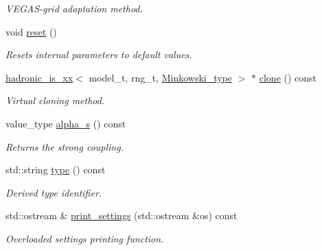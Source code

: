 \begin{DoxyCompactItemize}
\begin{DoxyCompactList}\small\item\em V\+E\+G\+A\+S-\/grid adaptation method. \end{DoxyCompactList}\item 
\hypertarget{a00261_ac4a595e2cdbea918c39193f46b87fb25}{}void \hyperlink{a00261_ac4a595e2cdbea918c39193f46b87fb25}{reset} ()\label{a00261_ac4a595e2cdbea918c39193f46b87fb25}

\begin{DoxyCompactList}\small\item\em Resets internal parameters to default values. \end{DoxyCompactList}\item 
\hypertarget{a00261_a3acbcfeec5ac28ec4ffbbf6c7aebfa69}{}\hyperlink{a00260}{hadronic\+\_\+is\+\_\+xx}$<$ model\+\_\+t, rng\+\_\+t, \hyperlink{a00371}{Minkowski\+\_\+type} $>$ $\ast$ \hyperlink{a00261_a3acbcfeec5ac28ec4ffbbf6c7aebfa69}{clone} () const \label{a00261_a3acbcfeec5ac28ec4ffbbf6c7aebfa69}

\begin{DoxyCompactList}\small\item\em Virtual cloning method. \end{DoxyCompactList}\item 
\hypertarget{a00261_a4f937cd0321590bffdc1fee47f011fbb}{}value\+\_\+type \hyperlink{a00261_a4f937cd0321590bffdc1fee47f011fbb}{alpha\+\_\+s} () const \label{a00261_a4f937cd0321590bffdc1fee47f011fbb}

\begin{DoxyCompactList}\small\item\em Returns the strong coupling. \end{DoxyCompactList}\item 
\hypertarget{a00261_a500b5a0a7febf4c0b500c1793e9993ae}{}std\+::string \hyperlink{a00261_a500b5a0a7febf4c0b500c1793e9993ae}{type} () const \label{a00261_a500b5a0a7febf4c0b500c1793e9993ae}

\begin{DoxyCompactList}\small\item\em Derived type identifier. \end{DoxyCompactList}\item 
\hypertarget{a00261_ae4d7ac1b77a4ccfa09c10ca286d0d7b2}{}std\+::ostream \& \hyperlink{a00261_ae4d7ac1b77a4ccfa09c10ca286d0d7b2}{print\+\_\+settings} (std\+::ostream \&os) const \label{a00261_ae4d7ac1b77a4ccfa09c10ca286d0d7b2}

\begin{DoxyCompactList}\small\item\em Overloaded settings printing function. \end{DoxyCompactList}\end{DoxyCompactItemize}
